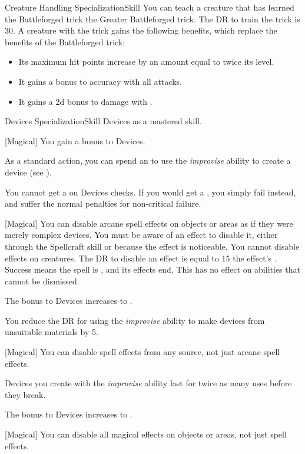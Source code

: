 \begin{feat}{Creature Handling Specialization}{Skill}
         You can teach a creature that has learned the Battleforged trick the Greater Battleforged trick.
        The DR to train the trick is 30.
        A creature with the trick gains the following benefits, which replace the benefits of the Battleforged trick:
        \begin{itemize}
            \item Its maximum hit points increase by an amount equal to twice its level.
            \item It gains a  bonus to accuracy with all attacks.
            \item It gains a \plus2d bonus to damage with .
        \end{itemize}
    \end{feat}

    \begin{feat}{Devices Specialization}{Skill}
        \featpre Devices as a mastered skill.
        \featben

        [Magical] You gain a  bonus to Devices.

         As a standard action, you can spend an  to use the \textit{improvise} ability to create a device (see ).

         You cannot get a  on Devices checks.
        If you would get a , you simply fail instead, and suffer the normal penalties for non-critical failure.

        [Magical] You can disable arcane spell effects on objects or areas as if they were merely complex devices.
        You must be aware of an effect to disable it, either through the Spellcraft skill or because the effect is noticeable.
        You cannot disable effects on creatures.
        The DR to disable an effect is equal to 15 \add the effect's .
        Success means the spell is , and its effects end.
        This has no effect on abilities that cannot be dismissed.

         The bonus to Devices increases to .

         You reduce the DR for using the \textit{improvise} ability to make devices from unsuitable materials by 5.

        [Magical] You can disable spell effects from any source, not just arcane spell effects.

         Devices you create with the \textit{improvise} ability last for twice as many uses before they break.

         The bonus to Devices increases to .

        [Magical] You can disable all magical effects on objects or areas, not just spell effects.
    \end{feat}

